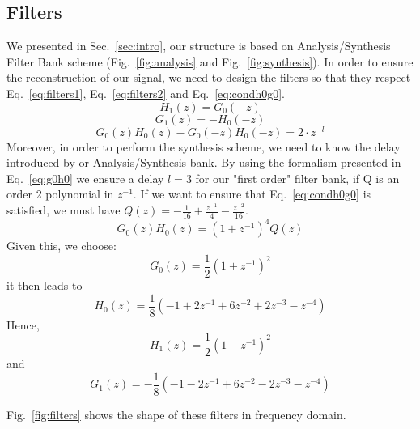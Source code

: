 \documentclass[a4paper,twocolumn]{article}
\begin{document}
\subsection{Filters}
\label{sec:reconstruction}
We presented in Sec.~\ref{sec:intro}, our structure is based on Analysis/Synthesis Filter Bank scheme (Fig.~\ref{fig:analysis} and Fig.~\ref{fig:synthesis}).
In order to ensure the reconstruction of our signal, we need to design the filters so that they respect Eq.~\ref{eq:filters1}, Eq.~\ref{eq:filters2} and Eq.~\ref{eq:condh0g0}.
\begin{equation}
  \label{eq:filters1}
H_1(z)=G_0(-z)
\end{equation}
\begin{equation}
\label{eq:filters2}
G_1(z)=-H_0(-z)		
\end{equation}
\begin{equation}
\label{eq:condh0g0}
G_0(z)H_0(z)-G_0(-z)H_0(-z)=2\cdot z^{-l}		
\end{equation}
 Moreover, in order to perform the synthesis scheme, we need to know the delay introduced by or Analysis/Synthesis bank. By using the formalism presented in Eq.~\ref{eq:g0h0} we ensure a delay $l=3$ for our "first order" filter bank, if Q is an order 2 polynomial in $z^{-1}$. If we want to ensure that Eq.~\ref{eq:condh0g0} is satisfied, we must have $Q(z)=-\frac{1}{16}+\frac{z^{-1}}{4}-\frac{z^{-2}}{16}$.
\begin{equation}
  \label{eq:g0h0}
G_0(z)H_0(z)=(1+z^{-1})^4Q(z)
\end{equation}
Given this, we choose:
\begin{equation}
 G_0(z)=\frac{1}{2}\left(1+z^{-1}\right)^2
\end{equation}
it then leads to 
\begin{equation}
H_0(z)=\frac{1}{8}\left(-1+2z^{-1}+6z^{-2}+2z^{-3}-z^{-4}\right)
\end{equation}
Hence, 
\begin{equation}
H_1(z)=\frac{1}{2}\left(1-z^{-1}\right)^2
\end{equation}
and
\begin{equation}
G_1(z)=-\frac{1}{8}\left(-1-2z^{-1}+6z^{-2}-2z^{-3}-z^{-4} \right)
\end{equation}

Fig.~\ref{fig:filters} shows the shape of these filters in frequency domain.
\end{document}
